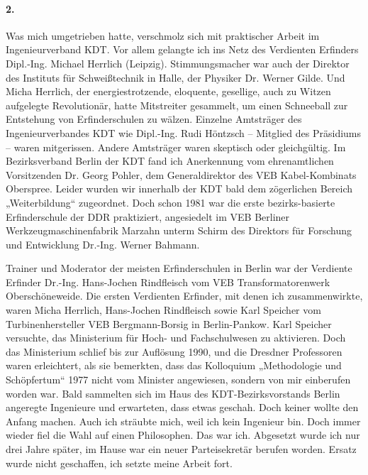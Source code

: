 \documentclass[12pt,a4paper]{article}
\begin{document}
\paragraph{2.}
Was mich umgetrieben hatte, verschmolz sich mit praktischer Arbeit im
Ingenieurverband KDT. Vor allem gelangte ich ins Netz des Verdienten Erfinders
Dipl.-Ing. Michael Herrlich (Leipzig). Stimmungsmacher war auch der Direktor
des Instituts für Schweißtechnik in Halle, der Physiker Dr. Werner Gilde. Und
Micha Herrlich, der energiestrotzende, eloquente, gesellige, auch zu Witzen
aufgelegte Revolutionär, hatte Mitstreiter gesammelt, um einen Schneeball zur
Entstehung von Erfinderschulen zu wälzen. Einzelne Amtsträger des
Ingenieurverbandes KDT wie Dipl.-Ing. Rudi Höntzsch – Mitglied des Präsidiums
– waren mitgerissen. Andere Amtsträger waren skeptisch oder gleichgültig. Im
Bezirksverband Berlin der KDT fand ich Anerkennung vom ehrenamtlichen
Vorsitzenden Dr. Georg Pohler, dem Generaldirektor des VEB Kabel-Kombinats
Oberspree. Leider wurden wir innerhalb der KDT bald dem zögerlichen Bereich
„Weiterbildung“ zugeordnet. Doch schon 1981 war die erste bezirks-basierte
Erfinderschule der DDR praktiziert, angesiedelt im VEB Berliner
Werkzeugmaschinenfabrik Marzahn unterm Schirm des Direktors für Forschung und
Entwicklung Dr.-Ing. Werner Bahmann.

Trainer und Moderator der meisten Erfinderschulen in Berlin war der Verdiente
Erfinder Dr.-Ing. Hans-Jochen Rindfleisch vom VEB Transformatorenwerk
Oberschöneweide. Die ersten Verdienten Erfinder, mit denen ich zusammenwirkte,
waren Micha Herrlich, Hans-Jochen Rindfleisch sowie Karl Speicher vom
Turbinenhersteller VEB Bergmann-Borsig in Berlin-Pankow. Karl Speicher
versuchte, das Ministerium für Hoch- und Fachschulwesen zu aktivieren.  Doch
das Ministerium schlief bis zur Auflösung 1990, und die Dresdner Professoren
waren erleichtert, als sie bemerkten, dass das Kolloquium „Methodologie und
Schöpfertum“ 1977 nicht vom Minister angewiesen, sondern von mir einberufen
worden war. Bald sammelten sich im Haus des KDT-Bezirksvorstands Berlin
angeregte Ingenieure und erwarteten, dass etwas geschah.  Doch keiner wollte
den Anfang machen. Auch ich sträubte mich, weil ich kein Ingenieur bin. Doch
immer wieder fiel die Wahl auf einen Philosophen.  Das war ich. Abgesetzt
wurde ich nur drei Jahre später, im Hause war ein neuer Parteisekretär berufen
worden. Ersatz wurde nicht geschaffen, ich setzte meine Arbeit fort.
\end{document}
